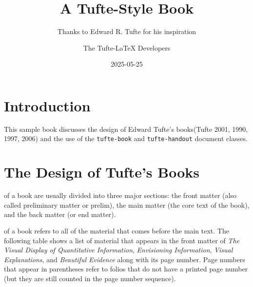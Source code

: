 \documentclass[
  twoside,
  symmetric]{tufte-book}
\title{A Tufte-Style Book}
\subtitle{Thanks to Edward R. Tufte for his inspiration}
\author{The Tufte-LaTeX Developers}
\date{2025-05-25}
\newcommand{\VDQI}{\textit{The Visual Display of Quantitative Information}\xspace}
\newcommand{\EI}{\textit{Envisioning Information}\xspace}
\newcommand{\VE}{\textit{Visual Explanations}\xspace}
\newcommand{\BE}{\textit{Beautiful Evidence}\xspace}
\renewcommand*\contentsname{Table of contents}
\newcommand\contentsname{Table of contents}
\begin{document}
\frontmatter
\maketitle

\renewcommand*\contentsname{Table of contents}
{
\hypersetup{linkcolor=}
\setcounter{tocdepth}{2}
\tableofcontents
}
\listoffigures
\listoftables

\mainmatter
\chapter*{Introduction}\label{introduction}

This sample book discusses the design of Edward Tufte's books(Tufte
2001, 1990, 1997, 2006) and the use of the \texttt{tufte-book} and
\texttt{tufte-handout} document classes.

\chapter{The Design of Tufte's Books}\label{ch:tufte-design}

 of a book are usually divided into three major
sections: the front matter (also called preliminary matter or prelim),
the main matter (the core text of the book), and the back matter (or end
matter).

 of a book refers to all of the material
that comes before the main text. The following table shows a list of
material that appears in the front matter of \VDQI, \EI, \VE, and
\BE along with its page number. Page numbers that appear in parentheses
refer to folios that do not have a printed page number (but they are
still counted in the page number sequence).
\end{document}
